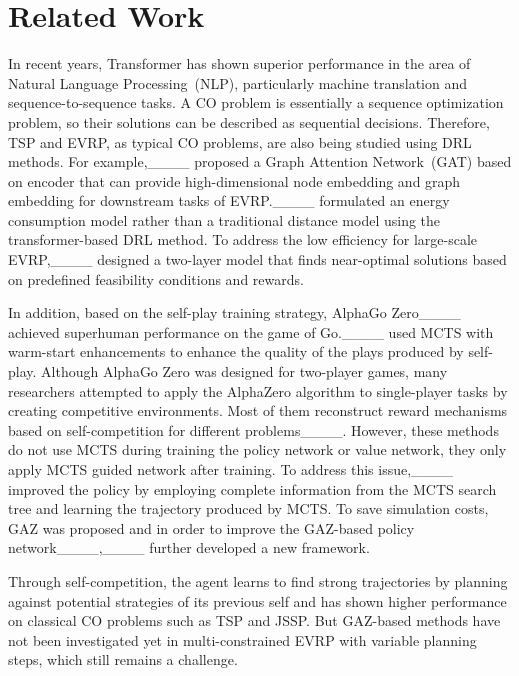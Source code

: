 \section{Related Work}
In recent years, Transformer has shown superior performance in the area of Natural Language Processing~(NLP), particularly machine translation and sequence-to-sequence tasks. A CO problem is essentially a sequence optimization problem, so their solutions can be described as sequential decisions. Therefore, TSP and EVRP, as typical CO problems, are also being studied using DRL methods. For example,____ proposed a Graph Attention Network~(GAT) based on encoder that can provide high-dimensional node embedding and graph embedding for downstream tasks of EVRP.____ formulated an energy consumption model rather than a traditional distance model using the transformer-based DRL method. To address the low efficiency for large-scale EVRP,____ designed a two-layer model that finds near-optimal solutions based on predefined feasibility conditions and rewards. 

In addition, based on the self-play training strategy, AlphaGo Zero____ achieved superhuman performance on the game of Go.____ used MCTS with warm-start enhancements to enhance the quality of the plays produced by self-play. Although AlphaGo Zero was designed for two-player games, many researchers attempted to apply the AlphaZero algorithm to single-player tasks by creating competitive environments. Most of them reconstruct reward mechanisms based on self-competition for different problems____. However, these methods do not use MCTS during training the policy network or value network, they only apply MCTS guided network after training. To address this issue,____ improved the policy by employing complete information from the MCTS search tree and learning the trajectory produced by MCTS. To save simulation costs, GAZ was proposed and in order to improve the GAZ-based policy network____,____ further developed a new framework. 

Through self-competition, the agent learns to find strong trajectories by planning against potential strategies of its previous self and has shown higher performance on classical CO problems such as TSP and JSSP. But GAZ-based methods have not been investigated yet in multi-constrained EVRP with variable planning steps, which still remains a challenge.